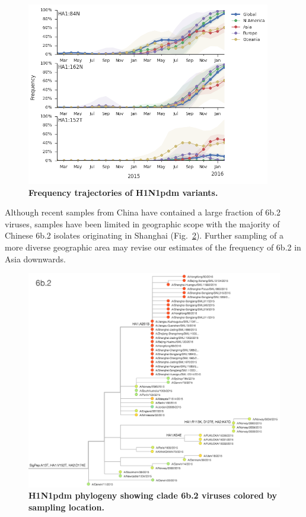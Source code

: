 \documentclass[11pt,oneside,letterpaper]{article}
\begin{document}
\begin{figure}[h!]
	\centering		
	\includegraphics[width=0.95\textwidth]{../figures/feb-2016/H1N1pdm_mutations.png}
	\caption{\textbf{Frequency trajectories of H1N1pdm variants.} 
	}
	\label{H1N1pdm_mutations}
\end{figure}

Although recent samples from China have contained a large fraction of 6b.2 viruses, samples have been limited in geographic scope with the majority of Chinese 6b.2 isolates originating in Shanghai (Fig.\ \ref{H1N1pdm_6b2_tree}). Further sampling of a more diverse geographic area may revise our estimates of the frequency of 6b.2 in Asia downwards.

\begin{figure}[h!]
	\centering		
	\includegraphics[width=1.0\textwidth]{../figures/feb-2016/H1N1pdm_6b2_tree.png}
	\caption{\textbf{H1N1pdm phylogeny showing clade 6b.2 viruses colored by sampling location.} 
	}
	\label{H1N1pdm_6b2_tree}
\end{figure}
\end{document}

